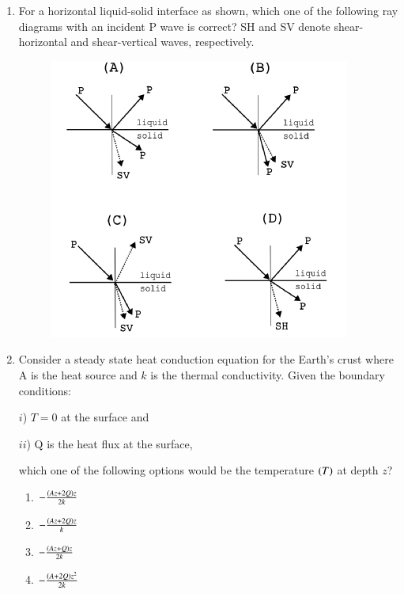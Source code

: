 \documentclass[journal,12pt,onecolumn]{IEEEtran}
\theoremstyle{remark}
\begin{document}
\begin{enumerate}
\item For a horizontal liquid-solid interface as shown, which one of the following ray diagrams with an incident P wave is correct? SH and SV denote shear-horizontal and shear-vertical waves, respectively.
\begin{figure}[H]
    \centering
    \includegraphics[width=0.7\columnwidth]{figs/fig16.png}
    \caption{}
    \label{fig:q48}
\end{figure}
\hfill{}
\begin{enumerate}
\end{enumerate}

\item Consider a steady state heat conduction equation for the Earth's crust where A is the heat source and $k$ is the thermal conductivity. Given the boundary conditions: 

$i$) $T=0$ at the surface and 

$ii$) Q is the heat flux at the surface, 

which one of the following options would be the temperature $\left(T\right)$ at depth $z$? \hfill{}
\begin{enumerate}
    \item $-\frac{\left(Az+2Q\right)z}{2k}$
    \item $-\frac{\left(Az+2Q\right)z}{k}$
    \item $-\frac{\left(Az+Q\right)z}{2k}$
    \item $-\frac{\left(A+2Q\right)z^2}{2k}$
\end{enumerate}


\end{enumerate}
\end{document}
